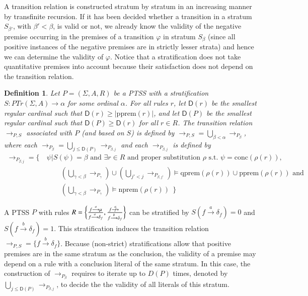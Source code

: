 \documentclass[submission,copyright,creativecommons]{eptcs}
\newtheorem{definition}{Definition}
\newcommand{\trans}[1][]{\xrightarrow{\, {#1} \, }}
\newcommand{\strans}[1][]{\stackrel{#1}{\longrightarrow}}
\newcommand{\PTrn}{\textit{PTr}}
\newcommand{\PTr}{\PTrn(\Sigma, A)}
\newcommand{\pprem}[1]{\textrm{pprem}(#1)}
\newcommand{\nprem}[1]{\textrm{nprem}(#1)}
\newcommand{\qprem}[1]{\textrm{qprem}(#1)}
\newcommand{\conc}[1]{\textrm{conc}(#1)}
\newcommand{\degPTSS}{\textsf{D}}
\begin{document}
A transition relation is constructed stratum by stratum in an
increasing manner by transfinite recursion.  
If it has been decided whether a
transition in a stratum $S_{\beta'}$, with $\beta'<\beta$, is valid or
not, we already know the validity of the negative premise occurring in
the premises of a transition $\varphi$ in stratum $S_\beta$ (since all
positive instances of the negative premises are in strictly lesser
strata) and hence we can determine the validity of $\varphi$.
Notice that a stratification does not take quantitative premises into account because 
their satisfaction does not depend on the transition relation.


\begin{definition}\label{def:assoc_with}Let $P = (\Sigma, A, R)$ be a PTSS with a stratification
  $S:\PTr\to\alpha$ for some ordinal $\alpha$.
For all rules $r$, let $\degPTSS(r)$ be the smallest regular cardinal
  such that $\degPTSS(r) \ge |\pprem{r}|$, 
  and let $\degPTSS(P)$ be the smallest
  regular cardinal such that $\degPTSS(P)\geq\degPTSS(r)$ for all
  $r\in R$.
The transition relation $\trans_{P, S}$ \emph{associated with} $P$
  (and based on $S$) is defined by
${\trans_{P,S}} = \bigcup_{\beta < \alpha} {\trans_{P_\beta}}$,
where each $\trans_{P_\beta} = \bigcup_{j \leq \degPTSS(P)}
  {\trans_{P_{\beta,j}}}$ and each ${\trans_{P_{\beta,j}}}$ is defined
  by
\begin{align*}
  {\trans_{P_{\beta,j}}} = \Big\{ \ &
     \psi \mathrel{\big|}
     S(\psi) = \beta \text{ and }
     \exists r \in R \text{ and proper substitution } \rho \mbox{ s.t. }
     \psi = \conc{\rho(r)}, \\[-.5ex]
  & \qquad \textstyle (\bigcup_{ \gamma < \beta} {\trans_{P_\gamma}}) \cup (\bigcup_{ j' < j} {\trans_{P_{\beta,j'}}}) \models
       {\qprem{\rho(r)} \cup \pprem{\rho(r)}}  \text{ and } \\[-.5ex]
  & \qquad \textstyle (\bigcup_{ \gamma < \beta} {\trans_{P_\gamma}}) \models \nprem{\rho(r)} \ \ \Big\}
 \end{align*}
\end{definition}
\noindent
A PTSS $P$ with rules $R=\bigg\{\frac{ f \strans[a] \mu}{ f \strans[a] \delta_{f}}, \frac{ f \strans[a]\!\!\!\!\!\!\not \quad }{ f \strans[b] \delta_{f}}\bigg\}$
can be stratified by $S(f \trans[a] \delta_f) = 0$ and $S(f
\trans[b] \delta_f) = 1$.  This stratification induces the
transition relation ${\trans_{P,S}}=\{f \trans[b] \delta_f\}$. Because 
(non-strict) stratifications allow that positive premises are in the same
stratum as the conclusion, the validity of a premise may depend on a rule with a conclusion 
literal of the same stratum.
In this case, the construction of $\trans_{P_\beta}$ requires
to iterate up to $D(P)$  times, denoted by $\bigcup_{j \leq \degPTSS(P)} {\trans_{P_{\beta,j}}}$,
to decide the the validity of all literals of this stratum.
\end{document}
